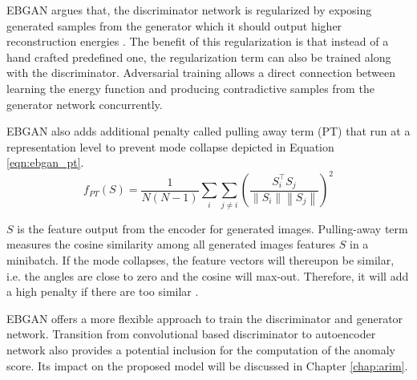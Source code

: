 EBGAN argues that, the discriminator network is regularized by exposing generated samples
from the generator  which it should output higher reconstruction energies
\cite{Zhao2016EnergybasedGA}. The benefit of this regularization is that instead of a hand crafted
predefined one, the regularization term can also be trained along with the discriminator.
Adversarial training allows a direct connection between learning the energy function and producing
contradictive samples from the generator network concurrently. 

EBGAN also adds additional penalty called pulling away term (PT) that run at a
representation level to prevent mode collapse depicted in Equation \ref{eqn:ebgan_pt}.
\begin{equation}
\label{eqn:ebgan_pt}
	f_{P T}(S)=\frac{1}{N(N-1)} \sum_{i} \sum_{j \neq i}\left(\frac{S_{i}^{\top} S_{j}}{\left\|S_{i}\right\|\left\|S_{j}\right\|}\right)^{2}
\end{equation}

 $S$ is the feature output from the encoder for generated images. Pulling-away term measures the
 cosine similarity among all generated images features $S$ in a minibatch. If the mode collapses,
 the feature vectors will thereupon be similar, i.e. the angles are close to zero and the cosine
 will max-out. Therefore, it will add a high penalty if there are too similar
 \cite{Zhao2016EnergybasedGA}.
 
 EBGAN offers a more flexible approach to train the discriminator and generator network. 
 Transition from convolutional based discriminator to autoencoder network also provides a potential inclusion 
 for the computation of the anomaly score. Its impact on the proposed model will be discussed in Chapter \ref{chap:arim}. 

\endgroup
